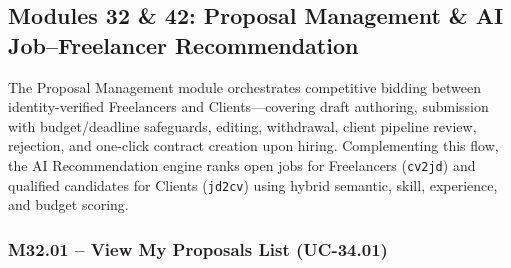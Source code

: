 
\newpage
\subsection{Modules 32 \& 42: Proposal Management \& AI Job--Freelancer Recommendation}

The Proposal Management module orchestrates competitive bidding between identity-verified Freelancers and Clients---covering draft authoring, submission with budget/deadline safeguards, editing, withdrawal, client pipeline review, rejection, and one-click contract creation upon hiring. Complementing this flow, the AI Recommendation engine ranks open jobs for Freelancers (\texttt{cv2jd}) and qualified candidates for Clients (\texttt{jd2cv}) using hybrid semantic, skill, experience, and budget scoring.

\subsubsection{M32.01 -- View My Proposals List (UC-34.01)}

